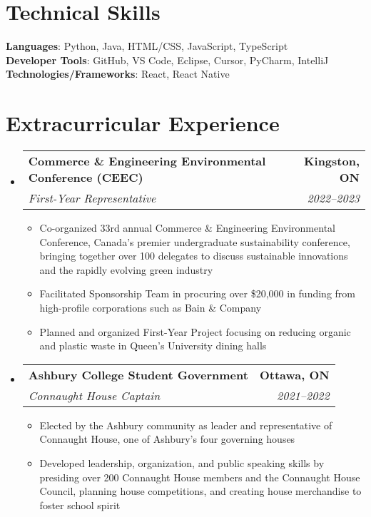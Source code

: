 \documentclass[letterpaper,10pt]{article}
\makeatletter
\newcommand{\resumeItem}[1]{
  \item\small{
    {#1 \vspace{-2pt}}
  }
}
\newcommand{\resumeSubheading}[4]{
  \vspace{-2pt}\item
    \begin{tabular*}{1.0\textwidth}[t]{l@{\extracolsep{\fill}}r}
      \textbf{#1} & \textbf{\small #2} \\
      \textit{\small#3} & \textit{\small #4} \\
    \end{tabular*}\vspace{-7pt}
}
\newcommand{\resumeSubHeadingListStart}{\begin{itemize}[leftmargin=0.0in, label={}]}
\newcommand{\resumeSubHeadingListEnd}{\end{itemize}}
\newcommand{\resumeItemListStart}{\begin{itemize}[label=--]}
\newcommand{\resumeItemListEnd}{\end{itemize}\vspace{-5pt}}
\makeatother
\begin{document}
%
\section{Technical Skills}
 \begin{itemize}[leftmargin=0.15in, label={}]
    \small{\item{
     \textbf{Languages}{: Python, Java, HTML/CSS, JavaScript, TypeScript} \\
     \textbf{Developer Tools}{: GitHub, VS Code, Eclipse, Cursor, PyCharm, IntelliJ} \\
     \textbf{Technologies/Frameworks}{: React, React Native} \\
    }}
 \end{itemize}
 \vspace{-16pt}

\section{Extracurricular Experience}
    \resumeSubHeadingListStart
      \resumeSubheading
        {Commerce \& Engineering Environmental Conference (CEEC)}{Kingston, ON}
        {First-Year Representative}{2022--2023}
        \resumeItemListStart
            \resumeItem{Co-organized 33rd annual Commerce \& Engineering Environmental Conference, Canada's premier undergraduate sustainability conference, bringing together over 100 delegates to discuss sustainable innovations and the rapidly evolving green industry}
            \resumeItem{Facilitated Sponsorship Team in procuring over \$20,000 in funding from high-profile corporations such as Bain \& Company}
            \resumeItem{Planned and organized First-Year Project focusing on reducing organic and plastic waste in Queen's University dining halls}
        \resumeItemListEnd
      \resumeSubheading
        {Ashbury College Student Government}{Ottawa, ON}
        {Connaught House Captain}{2021--2022}
        \resumeItemListStart
            \resumeItem{Elected by the Ashbury community as leader and representative of Connaught House, one of Ashbury's four governing houses}
            \resumeItem{Developed leadership, organization, and public speaking skills by presiding over 200 Connaught House members and the Connaught House Council, planning house competitions, and creating house merchandise to foster school spirit}
        \resumeItemListEnd
    \resumeSubHeadingListEnd

\end{document}
